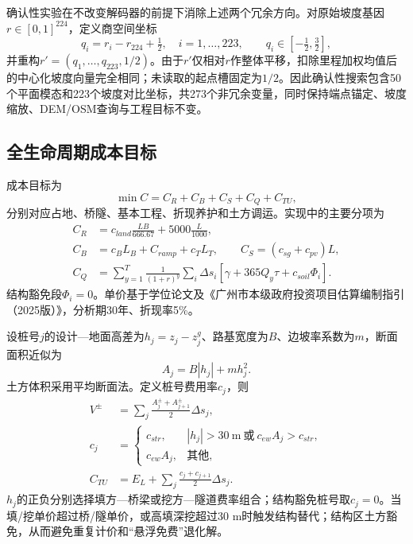 \documentclass[preprint,12pt]{elsarticle}
\begin{document}
确认性实验在不改变解码器的前提下消除上述两个冗余方向。对原始坡度基因$r\in[0,1]^{224}$，定义商空间坐标
\begin{equation}
q_i=r_i-r_{224}+\tfrac12,\quad i=1,\ldots,223,
\qquad q_i\in[-\tfrac12,\tfrac32],
\end{equation}
并重构$r'=(q_1,\ldots,q_{223},1/2)$。由于$r'$仅相对$r$作整体平移，扣除里程加权均值后的中心化坡度向量完全相同；未读取的起点槽固定为$1/2$。因此确认性搜索包含50个平面模态和223个坡度对比坐标，共273个非冗余变量，同时保持端点锚定、坡度缩放、DEM/OSM查询与工程目标不变。

\subsection{全生命周期成本目标}

成本目标为
\begin{equation}
\min C=C_R+C_B+C_S+C_Q+C_{TU},
\end{equation}
分别对应占地、桥隧、基本工程、折现养护和土方调运。实现中的主要分项为
\begin{align}
C_R&=c_{land}\frac{LB}{666.67}+5000\frac{L}{1000},\\
C_B&=c_BL_B+C_{ramp}+c_TL_T,\qquad C_S=(c_{sg}+c_{pv})L,\\
C_Q&=\sum_{y=1}^{T}\frac{1}{(1+r)^y}\sum_i\Delta s_i
[\gamma+365Q_y\tau+c_{soil}\Phi_i].
\end{align}
结构豁免段$\Phi_i=0$。单价基于学位论文及《广州市本级政府投资项目估算编制指引（2025版）》\cite{guangzhou2025}，分析期30年、折现率5\%。

设桩号$j$的设计—地面高差为$h_j=z_j-z^g_j$、路基宽度为$B$、边坡率系数为$m$，断面面积近似为
\begin{equation}
A_j=B|h_j|+mh_j^2.
\end{equation}
土方体积采用平均断面法。定义桩号费用率$c_j$，则
\begin{align}
V^{\pm}&=\sum_j\frac{A_j^{\pm}+A_{j+1}^{\pm}}{2}\Delta s_j,\\
c_j&=\begin{cases}
c_{str},&|h_j|>30\ \mathrm{m}\ \text{或}\ c_{ew}A_j>c_{str},\\
c_{ew}A_j,&\text{其他},
\end{cases}\\
C_{TU}&=E_L+\sum_j\frac{c_j+c_{j+1}}{2}\Delta s_j.
\end{align}
$h_j$的正负分别选择填方—桥梁或挖方—隧道费率组合；结构豁免桩号取$c_j=0$。当填/挖单价超过桥/隧单价，或高填深挖超过30 m时触发结构替代；结构区土方豁免，从而避免重复计价和“悬浮免费”退化解。
\end{document}
